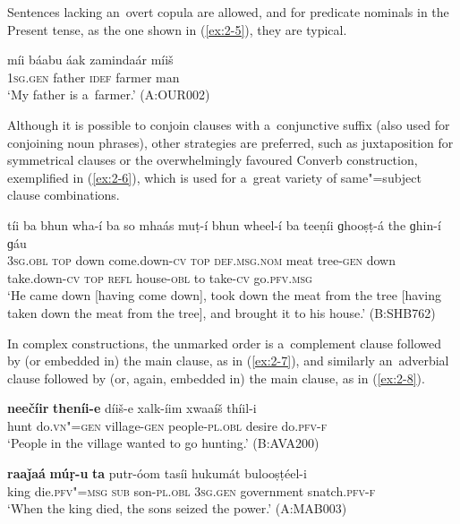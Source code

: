 Sentences lacking an~overt copula are allowed, and for predicate nominals in the Present tense, as the one shown in (\ref{ex:2-5}), they are typical.

\begin{exe}
\ex
\label{ex:2-5}
\gll míi báabu áak zamindaár míiš \\ 
\textsc{1sg.gen} father \textsc{idef} farmer man \\
\glt `My father is a~farmer.' (A:OUR002)
\end{exe}
Although it is possible to conjoin clauses with a~conjunctive suffix (also used for conjoining noun phrases), other strategies are preferred, such as juxtaposition for symmetrical clauses or the overwhelmingly favoured Converb construction, exemplified in (\ref{ex:2-6}), which is used for a~great variety of same"=subject clause combinations.

\begin{exe}
\ex
\label{ex:2-6}
\gll tíi ba {\ob}bhun wha-í ba{\cb} {\ob}so mhaás muṭ-í bhun wheel-í ba{\cb} {\ob}teeṇíi ɡhooṣṭ-á the ɡhin-í{\cb} ɡáu \\
\textsc{3sg.obl} \textsc{top} down come.down-\textsc{cv} \textsc{top} \textsc{def.msg.nom} meat tree-\textsc{gen} down take.down-\textsc{cv} \textsc{top} \textsc{refl} house-\textsc{obl} to take-\textsc{cv} go.\textsc{pfv.msg} \\
\glt `He came down [having come down], took down the meat from the tree [having taken down the meat from the tree], and brought it to his house.' (B:SHB762)
\end{exe}

In complex constructions, the unmarked order is a~complement clause followed by (or embedded in) the main clause, as in (\ref{ex:2-7}), and similarly an~adverbial clause followed by (or, again, embedded in) the main clause, as in (\ref{ex:2-8}). 

\begin{exe}
\ex
\label{ex:2-7}
\gll \textbf{neečíir} \textbf{theníi-e} díiš-e xalk-íim xwaaíš thíil-i \\
	hunt do.\textsc{vn"=gen} village\textsc{-gen} people\textsc{-pl.obl} desire do.\textsc{pfv-f} \\
\glt `People in the village wanted to go hunting.' (B:AVA200)
\end{exe}

\begin{exe}
\ex
\label{ex:2-8}
\gll \textbf{raaǰaá} \textbf{múṛ-u} \textbf{ta} putr-óom tasíi hukumát bulooṣṭéel-i \\
	king die.\textsc{pfv"=msg} \textsc{sub} son\textsc{-pl.obl} \textsc{3sg.gen} government snatch.\textsc{pfv-f} \\
\glt `When the king died, the sons seized the power.' (A:MAB003)
\end{exe}

